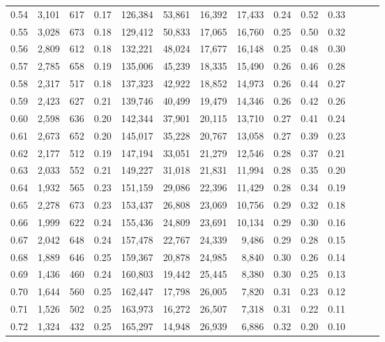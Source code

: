 \begin{tabular}{rrrrrrrrrrrrrr}
0.54 &  3,101 &  617 &  0.17 &  126,384 &   53,861 &  16,392 &  17,433 &  0.24 &  0.52 &      0.33 \\
0.55 &  3,028 &  673 &  0.18 &  129,412 &   50,833 &  17,065 &  16,760 &  0.25 &  0.50 &      0.32 \\
0.56 &  2,809 &  612 &  0.18 &  132,221 &   48,024 &  17,677 &  16,148 &  0.25 &  0.48 &      0.30 \\
0.57 &  2,785 &  658 &  0.19 &  135,006 &   45,239 &  18,335 &  15,490 &  0.26 &  0.46 &      0.28 \\
0.58 &  2,317 &  517 &  0.18 &  137,323 &   42,922 &  18,852 &  14,973 &  0.26 &  0.44 &      0.27 \\
0.59 &  2,423 &  627 &  0.21 &  139,746 &   40,499 &  19,479 &  14,346 &  0.26 &  0.42 &      0.26 \\
0.60 &  2,598 &  636 &  0.20 &  142,344 &   37,901 &  20,115 &  13,710 &  0.27 &  0.41 &      0.24 \\
0.61 &  2,673 &  652 &  0.20 &  145,017 &   35,228 &  20,767 &  13,058 &  0.27 &  0.39 &      0.23 \\
0.62 &  2,177 &  512 &  0.19 &  147,194 &   33,051 &  21,279 &  12,546 &  0.28 &  0.37 &      0.21 \\
0.63 &  2,033 &  552 &  0.21 &  149,227 &   31,018 &  21,831 &  11,994 &  0.28 &  0.35 &      0.20 \\
0.64 &  1,932 &  565 &  0.23 &  151,159 &   29,086 &  22,396 &  11,429 &  0.28 &  0.34 &      0.19 \\
0.65 &  2,278 &  673 &  0.23 &  153,437 &   26,808 &  23,069 &  10,756 &  0.29 &  0.32 &      0.18 \\
0.66 &  1,999 &  622 &  0.24 &  155,436 &   24,809 &  23,691 &  10,134 &  0.29 &  0.30 &      0.16 \\
0.67 &  2,042 &  648 &  0.24 &  157,478 &   22,767 &  24,339 &   9,486 &  0.29 &  0.28 &      0.15 \\
0.68 &  1,889 &  646 &  0.25 &  159,367 &   20,878 &  24,985 &   8,840 &  0.30 &  0.26 &      0.14 \\
0.69 &  1,436 &  460 &  0.24 &  160,803 &   19,442 &  25,445 &   8,380 &  0.30 &  0.25 &      0.13 \\
0.70 &  1,644 &  560 &  0.25 &  162,447 &   17,798 &  26,005 &   7,820 &  0.31 &  0.23 &      0.12 \\
0.71 &  1,526 &  502 &  0.25 &  163,973 &   16,272 &  26,507 &   7,318 &  0.31 &  0.22 &      0.11 \\
0.72 &  1,324 &  432 &  0.25 &  165,297 &   14,948 &  26,939 &   6,886 &  0.32 &  0.20 &      0.10 \\

\end{tabular}
